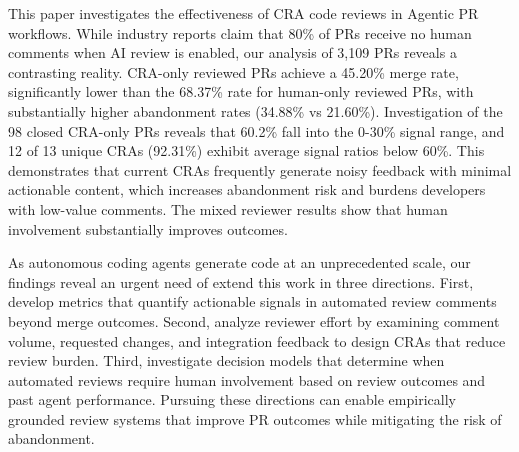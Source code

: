 \documentclass[sigconf]{acmart}
\begin{document}
This paper investigates the effectiveness of CRA code reviews in Agentic PR workflows. While industry reports claim that 80\% of PRs receive no human comments when AI review is enabled, our analysis of 3,109 PRs reveals a contrasting reality. CRA-only reviewed PRs achieve a 45.20\% merge rate, significantly lower than the 68.37\% rate for human-only reviewed PRs, with substantially higher abandonment rates (34.88\% vs 21.60\%). Investigation of the 98 closed CRA-only PRs reveals that 60.2\% fall into the 0-30\% signal range, and 12 of 13 unique CRAs (92.31\%) exhibit average signal ratios below 60\%. This demonstrates that current CRAs frequently generate noisy feedback with minimal actionable content, which increases abandonment risk and burdens developers with low-value comments. The mixed reviewer results show that human involvement substantially improves outcomes.

As autonomous coding agents generate code at an unprecedented scale, our findings reveal an urgent need of extend this work in three directions. First, develop metrics that quantify actionable signals in automated review comments beyond merge outcomes. Second, analyze reviewer effort by examining comment volume, requested changes, and integration feedback to design CRAs that reduce review burden. Third, investigate decision models that determine when automated reviews require human involvement based on review outcomes and past agent performance. Pursuing these directions can enable empirically grounded review systems that improve PR outcomes while mitigating the risk of abandonment.





\end{document}

